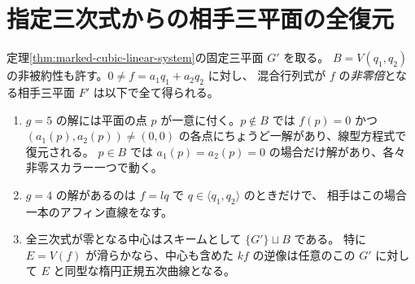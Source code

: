 \section{指定三次式からの相手三平面の全復元}
\label{sec:marked-companion-plane-reconstruction}
\begin{theorem}\label{thm:marked-companion-plane-reconstruction}
定理\ref{thm:marked-cubic-linear-system}の固定三平面 $G'$ を取る。
$B=V(q_1,q_2)$ の非被約性も許す。$0\ne f=a_1q_1+a_2q_2$ に対し、
混合行列式が $f$ の\emph{非零倍}となる相手三平面 $F'$ は以下で全て得られる。
\begin{enumerate}
\item $g=5$ の解には平面の点 $p$ が一意に付く。$p\notin B$ では
$f(p)=0$ かつ $(a_1(p),a_2(p))\ne(0,0)$ の各点にちょうど一解があり、線型方程式で復元される。
$p\in B$ では $a_1(p)=a_2(p)=0$ の場合だけ解があり、各々非零スカラー一つで動く。
\item $g=4$ の解があるのは $f=lq$ で $q\in\langle q_1,q_2\rangle$ のときだけで、
相手はこの場合一本のアフィン直線をなす。
\item 全三次式が零となる中心はスキームとして $\{G'\}\sqcup B$ である。
特に $E=V(f)$ が滑らかなら、中心も含めた $kf$ の逆像は任意のこの $G'$ に対して
$E$ と同型な楕円正規五次曲線となる。
\end{enumerate}
\end{theorem}

